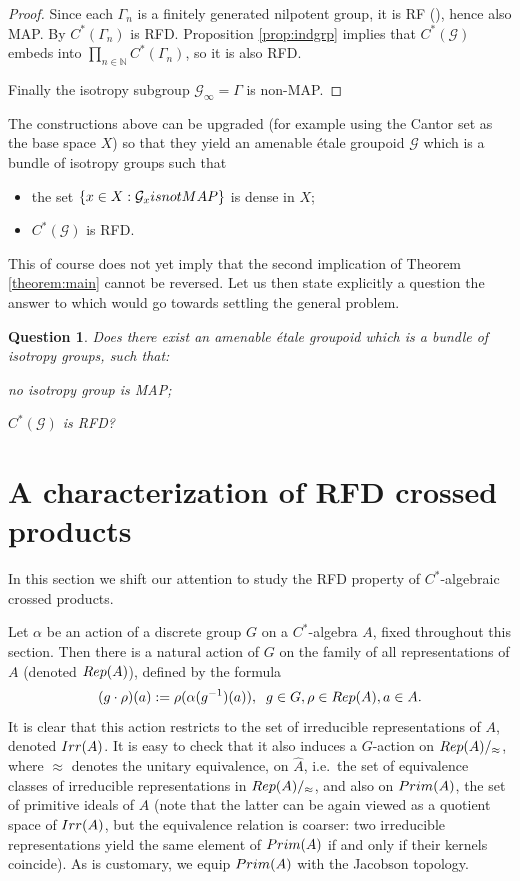 \documentclass[11 pt, leqno, hidelinks]{amsart}%
\theoremstyle{plain}
\newtheorem{quest}[theorem]{Question}
\numberwithin{equation}{section}
\newcommand{\N}{\mathbb{N}}
\newcommand{\GG}{\mathcal{G}}
\newcommand{\Rep}{\textup{Rep}}
\newcommand{\Irr}{\textup{Irr}}
\newcommand{\Prim}{\textup{Prim}}
\begin{document}
\begin{proof}
Since each $\Gamma_n$ is a finitely generated  nilpotent group, it is RF (\cite{Hirsch}), hence also MAP. By \cite[Theorem 4.3]{BekkaLouvet} $C^*(\Gamma_n)$ is RFD.
Proposition \ref{prop:indgrp} implies that $C^*(\GG)$ embeds into $\prod_{n \in \N} C^*(\Gamma_n)$, so it is also RFD.

Finally the isotropy subgroup $\GG_\infty = \Gamma$ is non-MAP.	
\end{proof}

The constructions  above can be upgraded (for example using the Cantor set as the base space $X$) so that they yield an amenable \'etale groupoid $\GG$ which is a bundle of isotropy groups such that
\begin{itemize}
\item[(i)] the set $\{x\in X: \GG_x \textup{ is not MAP}\}$ is dense in $X$;
\item[(ii)]	$C^*(\GG)$ is RFD.
	\end{itemize}

This of course does not yet imply that the second implication of Theorem \ref{theorem:main} cannot be reversed. Let us then state explicitly a question the answer to which would go towards settling the general problem.

\begin{quest} \label{quest}
Does there exist an amenable \'etale groupoid which is a bundle of isotropy groups, such that:
\item[(i)] no isotropy group is MAP;
\item[(ii)]	$C^*(\GG)$ is RFD?
\end{quest}





\section{A characterization of RFD crossed products} \label{Sec:crossedprod}

In this section we shift our attention to study the RFD property of $C^*$-algebraic crossed products.

Let $\alpha$ be an action of a discrete group $G$ on a $C^*$-algebra $A$, fixed throughout this section. Then there is a natural action  of $G$ on the family of all  representations of $A$  (denoted $\Rep(A)$),  defined by the formula
$$(g \cdot \rho)(a) := \rho(\alpha(g^{-1})(a)),  \;\;g \in G, \rho \in \Rep(A), a\in A.$$
It is clear that this action restricts to the set of irreducible representations of $A$, denoted $\Irr(A)$. It is easy to check that it also induces a $G$-action on $\Rep(A)/_\approx$, where $\approx$ denotes the unitary equivalence, on $\hat{A}$, i.e.\ the set of equivalence classes of irreducible representations in $\Rep(A)/_\approx$, and also on $\Prim(A)$, the set of primitive ideals of $A$ (note that the latter can be again viewed as a quotient space of $\Irr(A)$, but the equivalence relation is coarser: two irreducible representations yield the same element of $\Prim(A)$ if and only if their kernels coincide). As is customary, we equip $\Prim(A)$ with the Jacobson topology.
\end{document}
